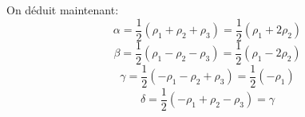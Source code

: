 \documentclass[12pt]{article}
\begin{document}
On d\'eduit maintenant:
\begin{equation}
 \alpha = \frac{1}{2}(\rho_1 + \rho_2 + \rho_3) = \frac{1}{2}(\rho_1 + 2\rho_2)
\end{equation}
\begin{equation}
  \beta = \frac{1}{2}(\rho_1 - \rho_2 - \rho_3) = \frac{1}{2}(\rho_1 - 2\rho_2)
\end{equation}
\begin{equation}
 \gamma = \frac{1}{2}(-\rho_1 - \rho_2 + \rho_3) = \frac{1}{2}(-\rho_1)
\end{equation}
\begin{equation}
  \delta = \frac{1}{2}(-\rho_1 + \rho_2 - \rho_3) = \gamma
\end{equation}
\end{document}
